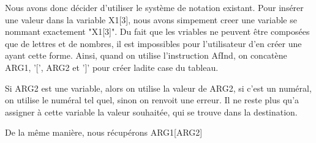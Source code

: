 \documentclass{article}
\begin{document}
Nous avons donc décider d'utiliser le système de notation existant. Pour insérer une valeur dans la variable X1[3], nous avons simpement creer une variable se nommant exactement "X1[3]".
Du fait que les vriables ne peuvent être composées que de lettres et de nombres, il est impossibles pour l'utilisateur d'en créer une ayant cette forme.
Ainsi, quand on utilise l'instruction AfInd, on concatène ARG1, '[', ARG2 et ']' pour créer ladite case du tableau.

Si ARG2 est une variable, alors on utilise la valeur de ARG2, si c'est un numéral, on utilise le numéral tel quel, sinon on renvoit une erreur.
Il ne reste plus qu'a assigner à cette variable la valeur souhaitée, qui se trouve dans la destination.

De la même manière, nous récupérons ARG1[ARG2]
\end{document}
